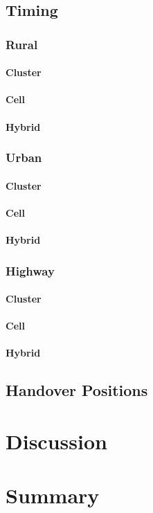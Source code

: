 \documentclass[master,english]{hgbthesis}
\begin{document}
\section{Timing}
\subsection{Rural}
\subsubsection{Cluster}
\subsubsection{Cell}
\subsubsection{Hybrid}
\subsection{Urban}
\subsubsection{Cluster}
\subsubsection{Cell}
\subsubsection{Hybrid}
\subsection{Highway}
\subsubsection{Cluster}
\subsubsection{Cell}
\subsubsection{Hybrid}
\section{Handover Positions}%
\chapter{Discussion}%
\chapter{Summary}%


\MakeBibliography
\end{document}
